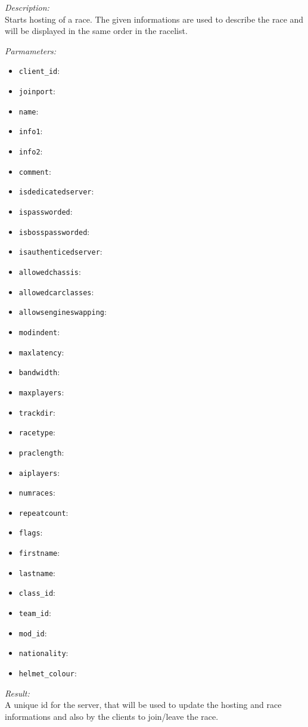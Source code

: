 \begin{description}
\item {\it Description:}\\
Starts hosting of a race. The given informations are used to describe the race and will be displayed in the same order in the racelist.
\item {\it Parmameters:}
\begin{itemize}
\item {\tt client\_id}: 
\item {\tt joinport}: 
\item {\tt name}: 
\item {\tt info1}: 
\item {\tt info2}: 
\item {\tt comment}: 
\item {\tt isdedicatedserver}: 
\item {\tt ispassworded}: 
\item {\tt isbosspassworded}: 
\item {\tt isauthenticedserver}: 
\item {\tt allowedchassis}: 
\item {\tt allowedcarclasses}: 
\item {\tt allowsengineswapping}: 
\item {\tt modindent}: 
\item {\tt maxlatency}: 
\item {\tt bandwidth}: 
\item {\tt maxplayers}: 
\item {\tt trackdir}: 
\item {\tt racetype}: 
\item {\tt praclength}: 
\item {\tt aiplayers}: 
\item {\tt numraces}: 
\item {\tt repeatcount}: 
\item {\tt flags}: 
\item {\tt firstname}: 
\item {\tt lastname}: 
\item {\tt class\_id}: 
\item {\tt team\_id}: 
\item {\tt mod\_id}: 
\item {\tt nationality}: 
\item {\tt helmet\_colour}: 
\end{itemize}
\item {\it Result:}\\
A unique id for the server, that will be used to update the hosting and race informations and also by the clients to join/leave the race.
\end{description}

